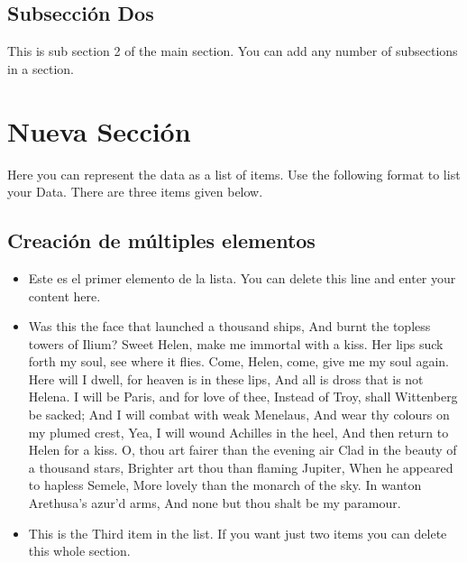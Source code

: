 \documentclass[a4paper, 10pt, conference]{ieeeconf}      %
\begin{document}
\subsection{Subsección Dos}

This is sub section 2 of the main section.
You can add any number of subsections in a section.

\section{Nueva Sección}

Here you can represent the data as a list of items. 
Use the following format to list your Data.
There are three items given below.

\subsection{Creación de múltiples elementos}

\begin{itemize}

\item
 Este es el primer elemento de la lista. You can delete this line and enter your content here.
 
 
\item

Was this the face that launched a thousand ships,
And burnt the topless towers of Ilium?
Sweet Helen, make me immortal with a kiss.
Her lips suck forth my soul, see where it flies.
Come, Helen, come, give me my soul again.
Here will I dwell, for heaven is in these lips,
And all is dross that is not Helena.
I will be Paris, and for love of thee,
Instead of Troy, shall Wittenberg be sacked;
And I will combat with weak Menelaus,
And wear thy colours on my plumed crest,
Yea, I will wound Achilles in the heel,
And then return to Helen for a kiss.
O, thou art fairer than the evening air
Clad in the beauty of a thousand stars,
Brighter art thou than flaming Jupiter,
When he appeared to hapless Semele,
More lovely than the monarch of the sky.
In wanton Arethusa's azur'd arms,
And none but thou shalt be my paramour. 


\item 

This is the Third item in the list. If you want just two items you can delete this whole section.

\end{itemize}
\end{document}
